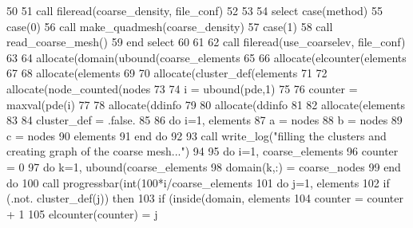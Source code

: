 \begin{DoxyCode}
50 \textcolor{comment}{      }
51 \textcolor{comment}{      }\textcolor{keyword}{call }fileread(coarse\_density, file\_conf)
52 
53 
54      \textcolor{keywordflow}{select case}(method)
55         \textcolor{keywordflow}{case}(0)
56             \textcolor{keyword}{call }make\_quadmesh(coarse\_density)
57         \textcolor{keywordflow}{case}(1)
58             \textcolor{keyword}{call }read\_coarse\_mesh()
59 \textcolor{keywordflow}{      end select}
60 
61       
62       \textcolor{keyword}{call }fileread(use_coarselev, file\_conf)
63             
64       \textcolor{keyword}{allocate}(domain(ubound(coarse_elements%
65 \textcolor{comment}{}
66 \textcolor{comment}{      }\textcolor{keyword}{allocate}(elcounter(elements%
67 
68       \textcolor{keyword}{allocate}(elements%
69 
70       \textcolor{keyword}{allocate}(cluster\_def(elements%
71       
72       \textcolor{keyword}{allocate}(node\_counted(nodes%
73 
74       i = ubound(pde,1)
75 
76       counter = maxval(pde(i)%
77 
78       \textcolor{keyword}{allocate}(ddinfo%
79 
80       \textcolor{keyword}{allocate}(ddinfo%
81       
82       \textcolor{keyword}{allocate}(elements%
83 
84       cluster\_def = .false.
85 
86       \textcolor{keywordflow}{do} i=1, elements%
87         a = nodes%
88         b = nodes%
89         c = nodes%
90         elements%
91 \textcolor{keywordflow}{      end do}
92 
93       \textcolor{keyword}{call }write_log(\textcolor{stringliteral}{"filling the clusters and creating graph of the coarse mesh..."}\textcolor{comment}{)}
94 \textcolor{comment}{            }
95 \textcolor{comment}{      }\textcolor{keywordflow}{do} i=1, coarse_elements%
96         counter = 0
97         \textcolor{keywordflow}{do} k=1, ubound(coarse_elements%
98           domain(k,:) = coarse_nodes%
99 \textcolor{keywordflow}{        end do}
100         \textcolor{keyword}{call }progressbar(int(100*i/coarse_elements%
101         \textcolor{keywordflow}{do} j=1, elements%
102           \textcolor{keywordflow}{if} (.not. cluster\_def(j)) \textcolor{keywordflow}{then}
103             \textcolor{keywordflow}{if} (inside(domain, elements%
104               counter = counter + 1
105               elcounter(counter) = j

\end{DoxyCode}
